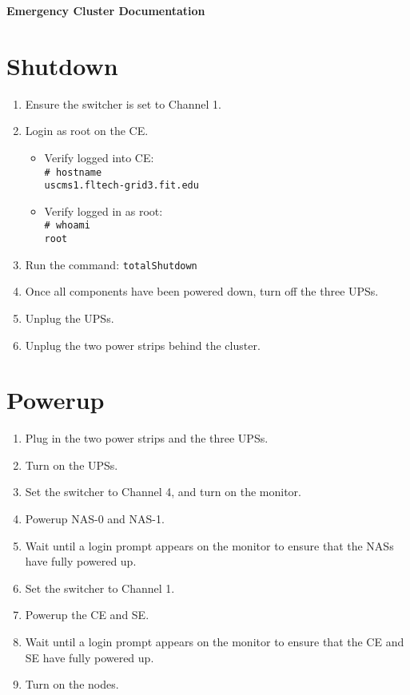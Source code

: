 \documentclass{article}
\begin{document}


\begin{center}
  \textbf{\huge Emergency Cluster Documentation}
\end{center}

\section*{\Large Shutdown}
\begin{enumerate}
\item Ensure the switcher is set to Channel 1.
\item Login as root on the CE.
  \begin{itemize}
  \item Verify logged into CE: \\{\tt\# hostname \\ uscms1.fltech-grid3.fit.edu}
  \item Verify logged in as root: \\{\tt\# whoami \\ root}
  \end{itemize}
\item Run the command: {\tt totalShutdown}
\item Once all components have been powered down, turn off the three UPSs.
\item Unplug the UPSs.
\item Unplug the two power strips behind the cluster.
\end{enumerate}

\section*{\Large Powerup}
\begin{enumerate}
\item Plug in the two power strips and the three UPSs.
\item Turn on the UPSs.
\item Set the switcher to Channel 4, and turn on the monitor.
\item Powerup NAS-0 and NAS-1.
\item Wait until a login prompt appears on the monitor to ensure that
  the NASs have fully powered up.
\item Set the switcher to Channel 1.
\item Powerup the CE and SE.
\item Wait until a login prompt appears on the monitor to ensure that
  the CE and SE have fully powered up.
\item Turn on the nodes.
\end{enumerate}
\end{document}

